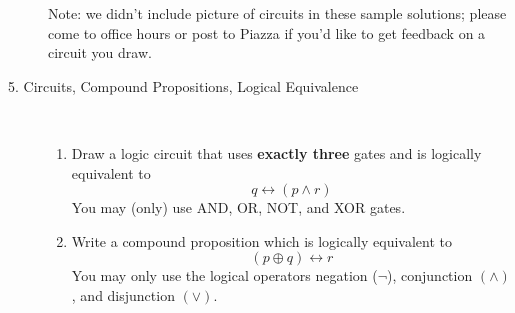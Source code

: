 \documentclass[12pt, oneside]{article}
\newif \ifsolution
\newcommand{\sol}[1]{\medskip\fbox{\begin{minipage}{5.5in}{#1}\end{minipage}}\medskip}
\begin{document}
\begin{description}
{{Note: we didn't include picture of circuits in these sample solutions; 
please come to office hours or post to Piazza if you'd like to get feedback 
on a circuit you draw.
}}
\fi


\item[5. Circuits, Compound Propositions, Logical Equivalence] \qquad \\
\begin{enumerate}\item Draw a logic circuit that uses 
{\bf exactly three} gates and is logically equivalent to
\[
q \leftrightarrow (p \wedge r)
\]
You may (only) use AND, OR, NOT, and XOR gates.

\ifsolution{
\sol{
Since XOR gates are available, we can use a convenient relationship between XOR and $\leftrightarrow$:
\[
q \leftrightarrow (p \wedge r) \equiv \neg ( q \oplus (p \land r) )
\]
Implementing this compound proposition as a circuit, we will use one XOR gate, one AND gate, and
one NOT gate, as required.

Note: we didn't include picture of circuits in these sample solutions; 
please come to office hours or post to Piazza if you'd like to get feedback 
on a circuit you draw.
}}
\fi


\item Write a compound proposition which is logically equivalent to
\[
(p \oplus q) \leftrightarrow r
\] 
You may only use the logical operators negation ($\neg$),
conjunction $(\wedge)$, and disjunction $(\vee)$.

\ifsolution{
\sol{ We apply several logical equivalences in turn: first, we can rewrite $\leftrightarrow$ in terms of 
$\land$ and $\to$:
\[
(p \oplus q) \leftrightarrow r \equiv (~ (p \oplus q) \to r~) \land (~r \to (p \oplus q)~)
\]
Now, we replace $\to$ by its equivalent disjunctive form: $HYP \to CONC \equiv (\neg HYP) \vee CONC$.
Thus, 
\[
(~ (p \oplus q) \to r~) \land (~r \to (p \oplus q)~) \equiv (~ \neg (p \oplus q) \vee r~) \land (~\neg r \vee (p \oplus q)~)
\]
Last, we replace the XOR with equivalent compound propositions in terms of the other connectives:
the XOR is true means one of its inputs is T and the other F; the XOR is false means its inputs are both T or both F.
\begin{align*}
&  (~ \neg (p \oplus q) \vee r~) \land (~\neg r \vee (p \oplus q)~) \equiv \\
&(~ ( (p \land q) \vee (\neg p \land \neg q) ) \vee r~) \land (~\neg r \vee ( ( p \land \neg q) \vee (\neg p \land q)) ~)
\end{align*}
}}
\fi


\end{enumerate}
\end{description}
\end{document}
